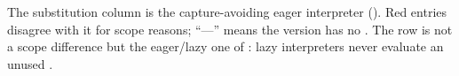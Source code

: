 The substitution column is the capture-avoiding eager interpreter  (). Red entries disagree with it for scope reasons; ``---'' means the version has no . The row  is not a scope difference but the eager/lazy one of : lazy interpreters never evaluate an unused .
